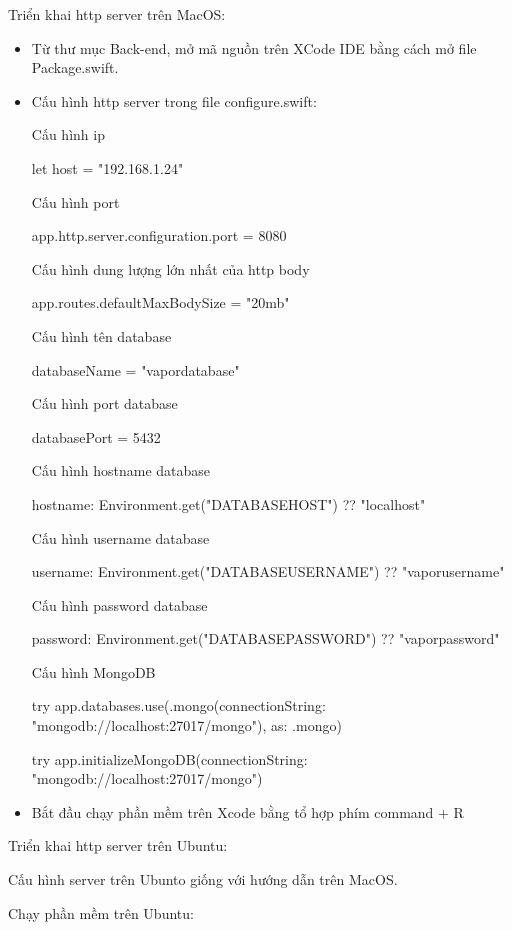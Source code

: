 \documentclass[../DoAn.tex]{subfiles}
\begin{document}
Triển khai http server trên MacOS: 

\begin{itemize}
    \item Từ thư mục Back-end, mở mã nguồn trên XCode IDE bằng cách mở file Package.swift.
    \item Cấu hình http server trong file configure.swift:

    Cấu hình ip

    let host = "192.168.1.24"

    Cấu hình port

    app.http.server.configuration.port = 8080

    Cấu hình dung lượng lớn nhất của http body
    
    app.routes.defaultMaxBodySize = "20mb"

    Cấu hình tên database

    databaseName = "vapordatabase"

    Cấu hình port database

    databasePort = 5432

    Cấu hình hostname database

    hostname: Environment.get("DATABASEHOST") ?? "localhost"

    Cấu hình username database
    
    username: Environment.get("DATABASEUSERNAME") ?? "vaporusername"


    Cấu hình password database
    
    password: Environment.get("DATABASEPASSWORD") ?? "vaporpassword"

    Cấu hình MongoDB

    try app.databases.use(.mongo(connectionString: "mongodb://localhost:27017/mongo"), as: .mongo)

    try app.initializeMongoDB(connectionString: "mongodb://localhost:27017/mongo")

    \item Bắt đầu chạy phần mềm trên Xcode bằng tổ hợp phím command + R
\end{itemize}


Triển khai http server trên Ubuntu:

Cấu hình server trên Ubunto giống với hướng dẫn trên MacOS.

Chạy phần mềm trên Ubuntu:
\end{document}
